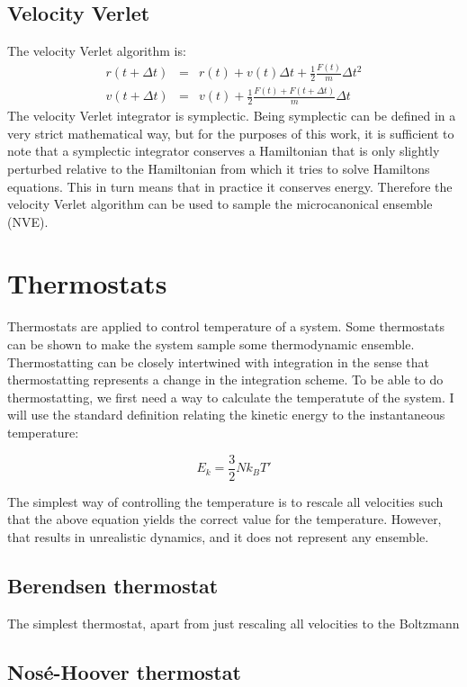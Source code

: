 \subsection{Velocity Verlet}
The velocity Verlet algorithm is:
\begin{align}
	r(t+\Delta t) &=& r(t) + v(t)\Delta t + \frac{1}{2}\frac{F(t)}{m}\Delta t^2 \\
	v(t + \Delta t) &=& v(t) + \frac{1}{2} \frac{F(t) + F(t+\Delta t)}{m}\Delta t
\end{align}
The velocity Verlet integrator is symplectic. Being symplectic can be defined in a very strict mathematical way, but for the purposes of this work, it is sufficient to note that a symplectic integrator conserves a Hamiltonian that is only slightly perturbed relative to the Hamiltonian from which it tries to solve Hamiltons equations. This in turn means that in practice it conserves energy. Therefore the velocity Verlet algorithm can be used to sample the microcanonical ensemble (NVE).

\section{Thermostats}
Thermostats are applied to control temperature of a system. Some thermostats can be shown to make the system sample some thermodynamic ensemble. Thermostatting can be closely intertwined with integration in the sense that thermostatting represents a change in the integration scheme. To be able to do thermostatting, we first need a way to calculate the temperatute of the system. I will use the standard definition relating the kinetic energy to the instantaneous temperature:

\begin{equation}
	E_k = \frac{3}{2} Nk_B T'
\end{equation}

The simplest way of controlling the temperature is to rescale all velocities such that the above equation yields the correct value for the temperature. However, that results in unrealistic dynamics, and it does not represent any ensemble.

\subsection{Berendsen thermostat}
The simplest thermostat, apart from just rescaling all velocities to the Boltzmann 
\subsection{Nosé-Hoover thermostat}


